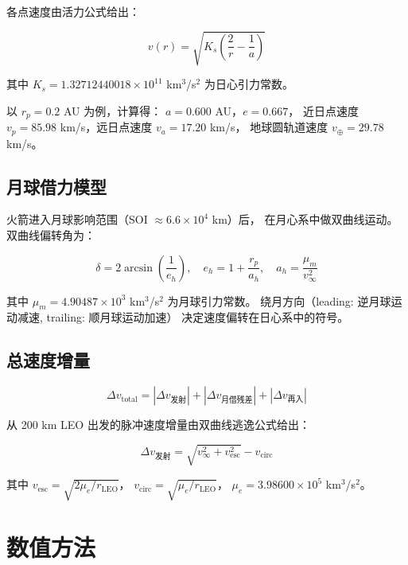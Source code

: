 \documentclass[12pt,a4paper]{ctexart}
\begin{document}
各点速度由活力公式给出：

\begin{equation}
v(r) = \sqrt{K_s\left(\frac{2}{r} - \frac{1}{a}\right)} \label{eq:visviva}
\end{equation}

其中 $K_s = 1.32712440018 \times 10^{11}$ km$^3$/s$^2$ 为日心引力常数。

以 $r_p = 0.2$ AU 为例，计算得：
$a = 0.600$ AU，$e = 0.667$，
近日点速度 $v_p = 85.98$ km/s，远日点速度 $v_a = 17.20$ km/s，
地球圆轨道速度 $v_{\oplus} = 29.78$ km/s。

\subsection{月球借力模型}

火箭进入月球影响范围（SOI $\approx 6.6 \times 10^4$ km）后，
在月心系中做双曲线运动。双曲线偏转角为：

\begin{equation}
\delta = 2\arcsin\left(\frac{1}{e_h}\right), \quad
e_h = 1 + \frac{r_p}{a_h}, \quad
a_h = \frac{\mu_m}{v_\infty^2}
\end{equation}

其中 $\mu_m = 4.90487 \times 10^3$ km$^3$/s$^2$ 为月球引力常数。
绕月方向（leading: 逆月球运动减速, trailing: 顺月球运动加速）
决定速度偏转在日心系中的符号。

\subsection{总速度增量}

\begin{equation}
\Delta v_{\text{total}} = |\Delta v_{\text{发射}}| + |\Delta v_{\text{月借残差}}| + |\Delta v_{\text{再入}}|
\end{equation}

从 200 km LEO 出发的脉冲速度增量由双曲线逃逸公式给出：

\begin{equation}
\Delta v_{\text{发射}} = \sqrt{v_\infty^2 + v_{\text{esc}}^2} - v_{\text{circ}}
\end{equation}

其中 $v_{\text{esc}} = \sqrt{2\mu_e/r_{\text{LEO}}}$，
$v_{\text{circ}} = \sqrt{\mu_e/r_{\text{LEO}}}$，
$\mu_e = 3.98600 \times 10^5$ km$^3$/s$^2$。

\section{数值方法}
\end{document}
